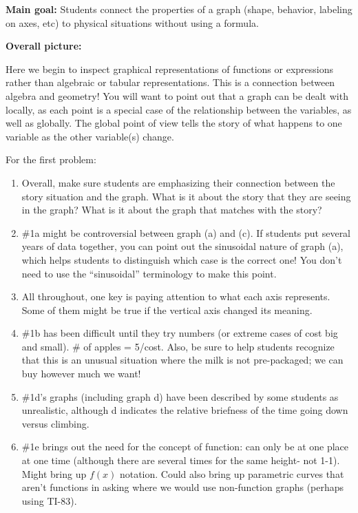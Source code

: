 \documentclass[nooutcomes,noauthor,handout]{ximera}
\begin{document}
\begin{instructorNotes} 

{\bf Main goal:} Students connect the properties of a graph (shape, behavior, labeling on axes, etc) to physical situations without using a formula.


{\bf Overall picture:}

Here we begin to inspect graphical representations of functions or expressions rather than algebraic or tabular representations.   This is a connection between algebra and geometry! You will want to point out that a graph can be dealt with locally, as each point is a special case of the relationship between the variables, as well as globally.  The global point of view tells the story of what happens to one variable as the other variable(s) change.

For the first problem:
\begin{enumerate}
	\item Overall, make sure students are emphasizing their connection between the story situation and the graph. What is it about the story that they are seeing in the graph? What is it about the graph that matches with the story?
    \item \#1a might be controversial between graph (a) and (c). If students put several years of data together, you can point out the sinusoidal nature of graph (a), which helps students to distinguish which case is the correct one! You don't need to use the ``sinusoidal'' terminology to make this point.
    \item All throughout, one key is paying attention to what each axis represents.  Some of them might be true if the vertical axis changed its meaning.
    \item \#1b has been difficult until they try numbers (or extreme cases of cost big and small).  \# of apples = 5/cost. Also, be sure to help students recognize that this is an unusual situation where the milk is not pre-packaged; we can buy however much we want!
    \item \#1d's graphs (including graph d) have been described by some students as unrealistic, although d indicates the relative briefness of the time going down versus climbing.
    \item \#1e brings out the need for the concept of function:  can only be at one place at one time (although there are several times for the same height- not 1-1).  Might bring up $f(x)$ notation. Could also bring up parametric curves that aren't functions in asking where we would use non-function graphs (perhaps using TI-83).
\end{enumerate}


\end{instructorNotes}
\end{document}
